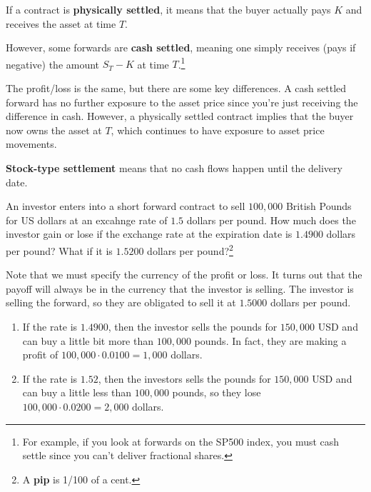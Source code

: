 \documentclass{article}
\begin{document}
      \begin{definition}
        If a contract is \textbf{physically settled}, it means that the buyer actually pays $K$ and receives the asset at time $T$. 
      \end{definition}

      \begin{definition}
        However, some forwards are \textbf{cash settled}, meaning one simply receives (pays if negative) the amount $S_T - K$ at time $T$.\footnote{For example, if you look at forwards on the SP500 index, you must cash settle since you can't deliver fractional shares. }
      \end{definition}

      The profit/loss is the same, but there are some key differences. A cash settled forward has no further exposure to the asset price since you're just receiving the difference in cash. However, a physically settled contract implies that the buyer now owns the asset at $T$, which continues to have exposure to asset price movements. 

      \begin{definition}
        \textbf{Stock-type settlement} means that no cash flows happen until the delivery date.
      \end{definition}

      \begin{exercise}[Hull 1.5]
        An investor enters into a short forward contract to sell $100,000$ British Pounds for US dollars at an excahnge rate of $1.5$ dollars per pound. How much does the investor gain or lose if the exchange rate at the expiration date is $1.4900$ dollars per pound? What if it is $1.5200$ dollars per pound?\footnote{A \textbf{pip} is 1/100 of a cent.}
      \end{exercise}
      \begin{solution}
        Note that we must specify the currency of the profit or loss. It turns out that the payoff will always be in the currency that the investor is selling. The investor is selling the forward, so they are obligated to sell it at $1.5000$ dollars per pound. 
        \begin{enumerate}
          \item If the rate is $1.4900$, then the investor sells the pounds for $150,000$ USD and can buy a little bit more than $100,000$ pounds. In fact, they are making a profit of $100,000 \cdot 0.0100 = 1,000$ dollars.
          \item If the rate is $1.52$, then the investors sells the pounds for $150,000$ USD and can buy a little less than $100,000$ pounds, so they lose $100,000 \cdot 0.0200 = 2,000$ dollars. 
        \end{enumerate}
      \end{solution}
\end{document}
